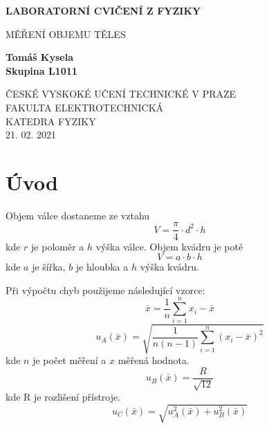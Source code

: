 \documentclass[titlepage]{article}
\begin{document}
	\begin{titlepage}
		\begin{center}
			\vspace*{1cm}
			
			\Large
			\textbf{LABORATORNÍ CVIČENÍ Z FYZIKY}
			
			\vspace{0.5cm}
			MĚŘENÍ OBJEMU TĚLES
			
			\vspace{1.5cm}
			
			\textbf{Tomáš Kysela}\\
			\textbf{Skupina L1011}
			
			\vfill
			
			\vspace{0.8cm}
			
			
			ČESKÉ VYSKOKÉ UČENÍ TECHNICKÉ V PRAZE\\
			FAKULTA ELEKTROTECHNICKÁ\\
			KATEDRA FYZIKY\\
			21. 02. 2021
			
		\end{center}
	\end{titlepage}
	\section{Úvod}
	Objem válce dostaneme ze vztahu
	\begin{equation}
		V = \frac{\pi}{4} \cdot d^2 \cdot h
	\end{equation}
kde $r$ je poloměr a $h$ výška válce.
	Objem kvádru je poté
	\begin{equation}
		V = a \cdot b \cdot h
	\end{equation}
kde $a$ je šířka, $b$ je hloubka a $h$ výška kvádru.

Při výpočtu chyb použijeme následující vzorce:
\begin{equation}
	\bar{x} = \frac{1}{n}\sum_{i=1}^{n}x_i-\bar{x}
\end{equation}
\begin{equation}
	u_A(\bar{x}) = \sqrt{\frac{1}{n(n-1)}\sum_{i=1}^{n}(x_i-\bar{x})^2}
\end{equation}
kde $n$ je počet měření a $x$ měřená hodnota.
\begin{equation}
	u_B(\bar{x}) = \frac{R}{\sqrt{12}}
\end{equation}
kde R je rozlišení přístroje.
\begin{equation}
	u_C(\bar{x}) = \sqrt{u_A^2(\bar{x}) + u_B^2(\bar{x})}
\end{equation}
\end{document}
